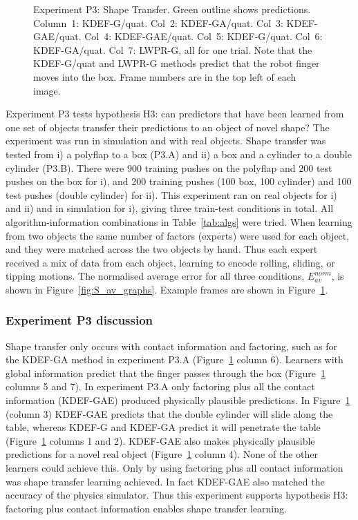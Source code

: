 \begin{figure}[t]
\caption {Experiment P3: Shape Transfer. Green outline shows predictions. Column~1: KDEF-G/quat. Col~2: KDEF-GA/quat. Col~3:
  KDEF-GAE/quat. Col~4: KDEF-GAE/quat. Col~5: KDEF-G/quat.
  Col~6: KDEF-GA/quat. Col~7: LWPR-G, all for one trial.  Note that the
  KDEF-G/quat and LWPR-G methods predict that the robot finger moves
  into the box.   Frame numbers are in
  the top left of each image.  }
\label{fig:ExperimentStransfer}
\end{figure}


Experiment P3 tests hypothesis H3: can predictors that have been learned from one set of objects transfer their predictions to an object of novel shape? The experiment was run in simulation and with real objects. Shape transfer was tested from i) a polyflap to a box (P3.A) and ii) a box and a cylinder to a double cylinder (P3.B). There were 900 training pushes on the polyflap and 200 test pushes on the box for i), and 200 training pushes (100 box, 100 cylinder) and 100 test pushes (double cylinder) for ii). This experiment ran on real objects for i) and ii) and in simulation for i), giving three train-test conditions in total. All algorithm-information combinations in Table~\ref{tab:algs} were tried. When learning from two objects the same number of factors (experts) were used for each object, and they were matched across the two objects by hand. Thus each expert received a mix of data from each object, learning to encode rolling, sliding, or tipping motions.  The normalised average error for all three conditions, $E_{av}^{norm}$, is shown in Figure~\ref{fig:S_av_graphs}. Example frames are shown in Figure~\ref{fig:ExperimentStransfer}.

\subsubsection{Experiment P3 discussion} Shape transfer only occurs with contact information and factoring, such as for the
KDEF-GA method in experiment P3.A (Figure~\ref{fig:ExperimentStransfer} column 6).  Learners with global information predict that the finger passes through the box (Figure~\ref{fig:ExperimentStransfer} columns 5 and 7). In experiment P3.A only factoring plus all the contact information (KDEF-GAE) produced physically plausible predictions. In Figure~\ref{fig:ExperimentStransfer} (column 3) KDEF-GAE predicts that the double cylinder will slide along the table, whereas KDEF-G and KDEF-GA predict it will penetrate the table (Figure~\ref{fig:ExperimentStransfer} columns 1 and 2). KDEF-GAE also makes physically plausible predictions for a novel real object 
(Figure~\ref{fig:ExperimentStransfer} column 4). None of the other learners could achieve this. Only by using factoring plus all contact information was shape transfer learning achieved. In fact KDEF-GAE also matched the accuracy of the physics simulator. Thus this experiment supports hypothesis H3: factoring plus contact information enables shape transfer learning.

